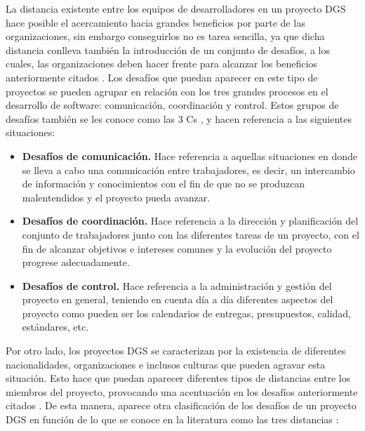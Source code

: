 La distancia existente entre los equipos de desarrolladores en un proyecto DGS hace posible el acercamiento hacia grandes beneficios por parte de las organizaciones, sin embargo conseguirlos no es tarea sencilla, ya que dicha distancia conlleva también la introducción de un conjunto de desafíos, a los cuales, las organizaciones deben hacer frente para alcanzar los beneficios anteriormente citados \cite{conchuir2006exploring}. Los desafíos que puedan aparecer en este tipo de proyectos se pueden agrupar en relación con los tres grandes procesos en el desarrollo de software: comunicación, coordinación y control. Estos grupos de desafíos también se les conoce como las 3 Cs \cite{vizcaino2015vision, piattini2014desarrollo}, y hacen referencia a las siguientes situaciones:

\begin{itemize}
	\item \textbf{Desafíos de comunicación.} Hace referencia a aquellas situaciones en donde se lleva a cabo una comunicación entre trabajadores, es decir, un intercambio de información y conocimientos con el fin de que no se produzcan malentendidos y el proyecto pueda avanzar.
	\item \textbf{Desafíos de coordinación.} Hace referencia a la dirección y planificación del conjunto de trabajadores junto con las diferentes tareas de un proyecto, con el fin de alcanzar objetivos e intereses comunes y la evolución del proyecto progrese adecuadamente.
	\item \textbf{Desafíos de control.} Hace referencia a la administración y gestión del proyecto en general, teniendo en cuenta día a día diferentes aspectos del proyecto como pueden ser los calendarios de entregas, presupuestos, calidad, estándares, etc. 
\end{itemize}

Por otro lado, los proyectos DGS se caracterizan por la existencia de diferentes nacionalidades, organizaciones e inclusos culturas que pueden agravar esta situación. Esto hace que puedan aparecer diferentes tipos de distancias entre los miembros del proyecto, provocando una acentuación en los desafíos anteriormente citados \cite{vizcaino2015vision}. De esta manera, aparece otra clasificación de los desafíos de un proyecto DGS en función de lo que se conoce en la literatura como las tres distancias \cite{vizcaino2015vision, conchuir2006exploring, conchuir2009global}:

